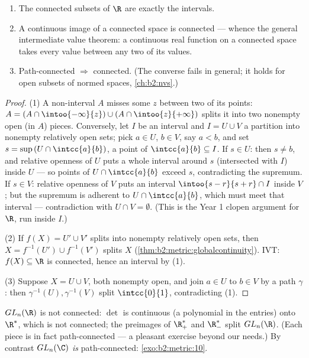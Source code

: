 \begin{theorem}\label{thm:b2:metric:connectedness}
\begin{enumerate}
  \item The connected subsets of $\R$ are exactly the intervals.
  \item A continuous image of a connected space is connected ---
        whence the general intermediate value theorem: a continuous
        real function on a connected space takes every value between
        any two of its values.
  \item Path-connected $\Rightarrow$ connected. (The converse fails
        in general; it holds for open subsets of normed spaces,
        \cref{ch:b2:nvs}.)
\end{enumerate}
\end{theorem}

\begin{proof}
(1) A non-interval $A$ misses some $z$ between two of its points:
$A = (A \cap \intoo{-\infty}{z}) \cup (A \cap \intoo{z}{+\infty})$
splits it into two nonempty open (in $A$) pieces. Conversely, let
$I$ be an interval and $I = U \cup V$ a partition into nonempty
relatively open sets; pick $a \in U$, $b \in V$, say $a < b$, and
set $s = \sup\,(U \cap \intcc{a}{b})$, a point of $\intcc{a}{b}
\subseteq I$. If $s \in U$: then $s \neq b$, and relative openness
of $U$ puts a whole interval around $s$ (intersected with $I$)
inside $U$ --- so points of $U \cap \intcc{a}{b}$ exceed $s$,
contradicting the supremum. If $s \in V$: relative openness of $V$
puts an interval $\intoo{s - r}{s + r} \cap I$ inside $V$; but the
supremum is adherent to $U \cap \intcc{a}{b}$, which must meet that
interval --- contradiction with $U \cap V = \emptyset$. (This is
the Year 1 clopen argument for $\R$, run inside $I$.)

(2) If $f(X) = U' \cup V'$ splits into nonempty relatively open
sets, then $X = f^{-1}(U') \cup f^{-1}(V')$ splits $X$
(\cref{thm:b2:metric:globalcontinuity}). IVT: $f(X) \subseteq \R$
is connected, hence an interval by (1).

(3) Suppose $X = U \cup V$, both nonempty open, and join $a \in U$
to $b \in V$ by a path $\gamma$: then $\gamma^{-1}(U),
\gamma^{-1}(V)$ split $\intcc{0}{1}$, contradicting (1).
\end{proof}

\begin{example}\label{ex:b2:metric:glnr}
$GL_n(\R)$ is not connected: $\det$ is continuous (a polynomial in
the entries) onto $\R^*$, which is not connected; the preimages of
$\R_+^*$ and $\R_-^*$ split $GL_n(\R)$. (Each piece is in fact
path-connected --- a pleasant exercise beyond our needs.) By
contrast $GL_n(\C)$ \emph{is} path-connected:
\cref{exo:b2:metric:10}.
\end{example}

